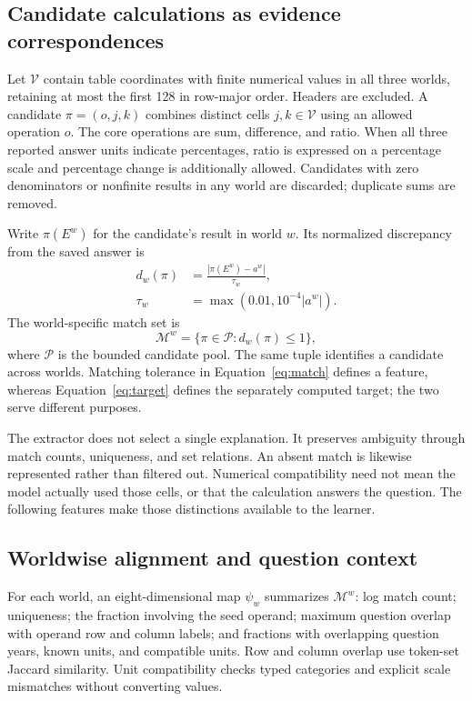 \subsection{Candidate calculations as evidence correspondences}
Let $\mathcal V$ contain table coordinates with finite numerical values in all three worlds, retaining at most the first 128 in row-major order. Headers are excluded. A candidate $\pi=(o,j,k)$ combines distinct cells $j,k\in\mathcal V$ using an allowed operation $o$. The core operations are sum, difference, and ratio. When all three reported answer units indicate percentages, ratio is expressed on a percentage scale and percentage change is additionally allowed. Candidates with zero denominators or nonfinite results in any world are discarded; duplicate sums are removed.

Write $\pi(E^w)$ for the candidate's result in world $w$. Its normalized discrepancy from the saved answer is
\begin{equation}
 \begin{aligned}
 d_w(\pi)&=\frac{|\pi(E^w)-a^w|}{\tau_w},\\
 \tau_w&=\max(0.01,10^{-4}|a^w|).
 \end{aligned}
 \label{eq:match}
\end{equation}
The world-specific match set is
\begin{equation}
 \mathcal M^w=\{\pi\in\mathcal P:d_w(\pi)\leq1\},
 \label{eq:set}
\end{equation}
where $\mathcal P$ is the bounded candidate pool. The same tuple identifies a candidate across worlds. Matching tolerance in Equation~\ref{eq:match} defines a feature, whereas Equation~\ref{eq:target} defines the separately computed target; the two serve different purposes.

The extractor does not select a single explanation. It preserves ambiguity through match counts, uniqueness, and set relations. An absent match is likewise represented rather than filtered out. Numerical compatibility need not mean the model actually used those cells, or that the calculation answers the question. The following features make those distinctions available to the learner.

\subsection{Worldwise alignment and question context}
For each world, an eight-dimensional map $\psi_w$ summarizes $\mathcal M^w$: log match count; uniqueness; the fraction involving the seed operand; maximum question overlap with operand row and column labels; and fractions with overlapping question years, known units, and compatible units. Row and column overlap use token-set Jaccard similarity. Unit compatibility checks typed categories and explicit scale mismatches without converting values.

